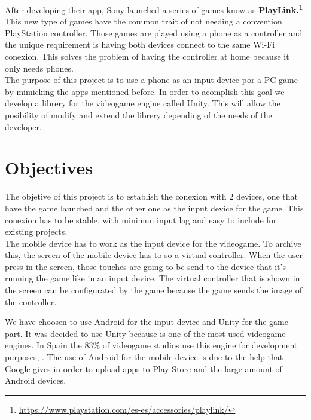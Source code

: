 After developing their app, Sony launched a series of games know as  \textbf{PlayLink.\footnote{\url{https://www.playstation.com/es-es/accessories/playlink/}}} This new type of games have the common trait of not needing a convention PlayStation controller. Those games are played using a phone as a controller and the unique requirement is having both devices connect to the same Wi-Fi conexion. This solves the problem of having the controller at home because it only needs phones.\\

The purpose of this project is to use a phone as an input device por a PC game by mimicking the apps mentioned before. In order to acomplish this goal we develop a librery for the videogame engine called Unity. This will allow the posibility of modify and extend the librery depending of the needs of the developer.\\


\section*{Objectives}

The objetive of this project is to establish the conexion with 2 devices, one that have the game launched and the other one as the input device for the game. This conexion has to be stable, with minimun input lag and easy to include for existing projects.\\

The mobile device has to work as the input device for the videogame. To archive this, the screen of the mobile device has to so a virtual controller. When the user press in the screen, those touches are going to be send to the device that it's running the game like in an input device. The virtual controller that is shown in the screen can be configurated by the game because the game sends the image of the controller.\\


We have choosen to use Android for the input device and Unity for the game part. It was decided to use Unity because is one of the most used videogame engines. In Spain the 83\% of videogame studios use this engine for development purposes, . The use of Android for the mobile device is due to the help that Google gives in order to upload apps to Play Store and the large amount of Android devices.\\

